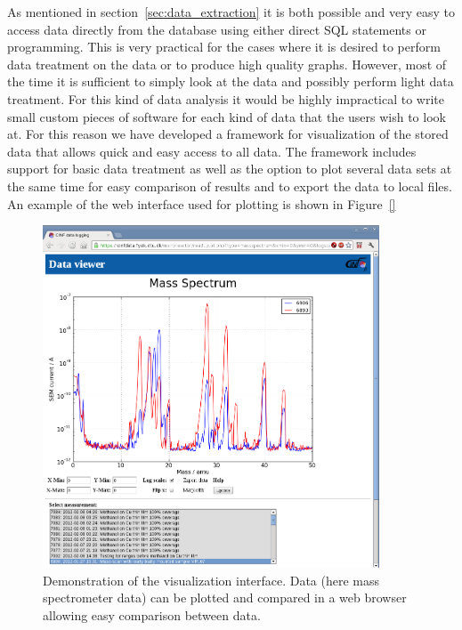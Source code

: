 As mentioned in section~\ref{sec:data_extraction} it is both possible and very
easy to access data directly from the database using either direct SQL
statements or programming. This is very practical for the cases where it is
desired to perform data treatment on the data or to produce high quality
graphs. However, most of the time it is sufficient to simply look at the data
and possibly perform light data treatment. For this kind of data analysis it
would be highly impractical to write small custom pieces of software for each
kind of data that the users wish to look at. For this reason we have developed
a framework for visualization of the stored data that allows quick and easy
access to all data. The framework includes support for basic data treatment as
well as the option to plot several data sets at the same time for easy
comparison of results and to export the data to local files. An example of the
web interface used for plotting is shown in Figure~\ref{}
\begin{figure}
 \begin{center}
 \includegraphics[width=10cm]{mass_spectra_comparison.png}
 \caption{Demonstration of the visualization interface. Data (here mass
   spectrometer data) can be plotted and compared in a web browser allowing
   easy comparison between data. \label{fig:system_overview}
 } 
 \end{center}
\end{figure}

